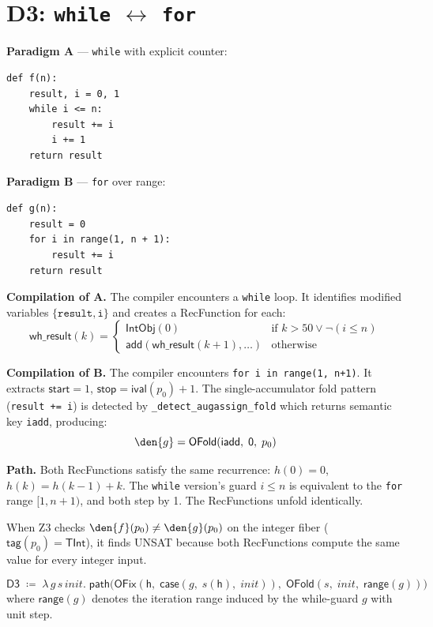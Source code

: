 \section{D3: \texttt{while} $\leftrightarrow$ \texttt{for}}
\label{sec:d3}

\textbf{Paradigm A} --- \texttt{while} with explicit counter:
\begin{lstlisting}
def f(n):
    result, i = 0, 1
    while i <= n:
        result += i
        i += 1
    return result
\end{lstlisting}

\textbf{Paradigm B} --- \texttt{for} over range:
\begin{lstlisting}
def g(n):
    result = 0
    for i in range(1, n + 1):
        result += i
    return result
\end{lstlisting}

\textbf{Compilation of A.}
The compiler encounters a \texttt{while} loop.  It identifies modified
variables $\{\texttt{result}, \texttt{i}\}$ and creates a RecFunction
for each:
\[
  \mathsf{wh\_result}(k) = \begin{cases}
    \mathsf{IntObj}(0) & \text{if } k > 50 \lor \lnot(i \leq n) \\
    \mathsf{add}(\mathsf{wh\_result}(k+1), \ldots)
      & \text{otherwise}
  \end{cases}
\]

\textbf{Compilation of B.}
The compiler encounters \texttt{for i in range(1, n+1)}.  It extracts
$\mathsf{start} = 1$, $\mathsf{stop} = \mathsf{ival}(p_0) + 1$.
The single-accumulator fold pattern
(\texttt{result += i}) is detected by \texttt{\_detect\_augassign\_fold}
which returns semantic key \texttt{iadd}, producing:
\[
  \den{g} = \mathsf{OFold}(\mathsf{iadd},\;
    \mathsf{0},\; p_0)
\]

\textbf{Path.}
Both RecFunctions satisfy the same recurrence:
$h(0) = 0$, $h(k) = h(k-1) + k$.
The \texttt{while} version's guard $i \leq n$ is equivalent to the
\texttt{for} range $[1, n+1)$, and both step by 1.  The RecFunctions
unfold identically.

When Z3 checks $\den{f}(p_0) \neq \den{g}(p_0)$ on the integer fiber
($\mathsf{tag}(p_0) = \mathsf{TInt}$), it finds UNSAT because both
RecFunctions compute the same value for every integer input.

\begin{definition}
\label{def:d3-path}
\[
  \mathsf{D3} \;\coloneqq\; \lambda\, g\, s\, \mathit{init}.\;
  \mathsf{path}\!\big(
    \mathsf{OFix}(\mathsf{h},\;
      \mathsf{case}(g,\; s(\mathsf{h}),\; \mathit{init})),\;
    \mathsf{OFold}(s,\; \mathit{init},\; \mathsf{range}(g))
  \big)
\]
where $\mathsf{range}(g)$ denotes the iteration range induced by
the while-guard $g$ with unit step.
\end{definition}


